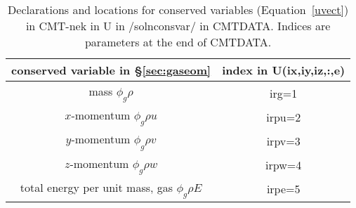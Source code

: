 \begin{table}
\begin{tabular}{|c|c|}
\hline
conserved variable in \S\ref{sec:gaseom} & index in U(ix,iy,iz,:,e) \\
\hline
mass $\phi_g \rho$ & irg=1 \\
$x$-momentum $\phi_g \rho u$ & irpu=2 \\
$y$-momentum $\phi_g \rho v$ & irpv=3 \\
$z$-momentum $\phi_g \rho w$ & irpw=4 \\
total energy per unit mass, gas $\phi_g \rho E$  & irpe=5 \\
\hline
\end{tabular}
\caption{Declarations and locations for conserved variables (Equation~\ref{uvect}) in CMT-nek in U in /solnconsvar/ in CMTDATA. Indices are parameters at the end of CMTDATA.}
\label{tab:cvar}
\end{table}

